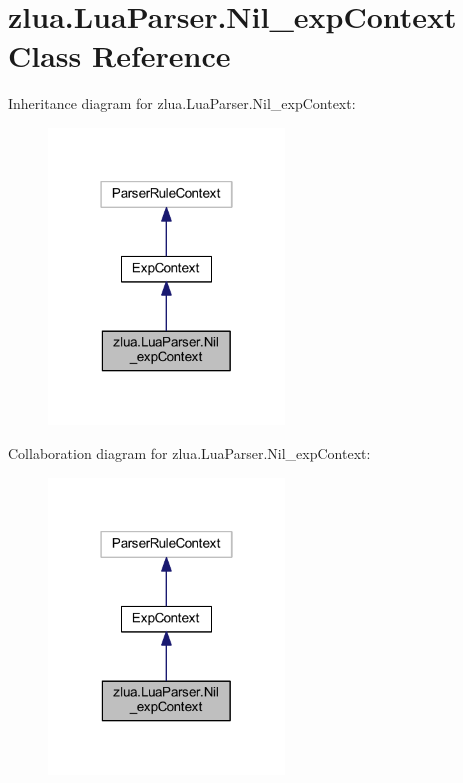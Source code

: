 \hypertarget{classzlua_1_1_lua_parser_1_1_nil__exp_context}{}\section{zlua.\+Lua\+Parser.\+Nil\+\_\+exp\+Context Class Reference}
\label{classzlua_1_1_lua_parser_1_1_nil__exp_context}


Inheritance diagram for zlua.\+Lua\+Parser.\+Nil\+\_\+exp\+Context\+:
\nopagebreak
\begin{figure}[H]
\begin{center}
\leavevmode
\includegraphics[width=178pt]{classzlua_1_1_lua_parser_1_1_nil__exp_context__inherit__graph}
\end{center}
\end{figure}


Collaboration diagram for zlua.\+Lua\+Parser.\+Nil\+\_\+exp\+Context\+:
\nopagebreak
\begin{figure}[H]
\begin{center}
\leavevmode
\includegraphics[width=178pt]{classzlua_1_1_lua_parser_1_1_nil__exp_context__coll__graph}
\end{center}
\end{figure}
